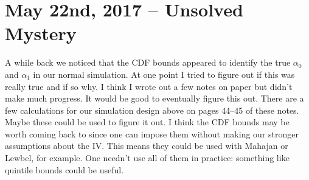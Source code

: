 \documentclass[12pt]{article}
\begin{document}


\section{May 22nd, 2017 -- Unsolved Mystery}
A while back we noticed that the CDF bounds appeared to identify the true $\alpha_0$ and $\alpha_1$ in our normal simulation.
At one point I tried to figure out if this was really true and if so why.
I think I wrote out a few notes on paper but didn't make much progress.
It would be good to eventually figure this out.
There are a few calculations for our simulation design above on pages 44--45 of these notes.
Maybe these could be used to figure it out.
I think the CDF bounds may be worth coming back to since one can impose them without making our stronger assumptions about the IV.
This means they could be used with Mahajan or Lewbel, for example.
One needn't use all of them in practice: something like quintile bounds could be useful.
\end{document}
